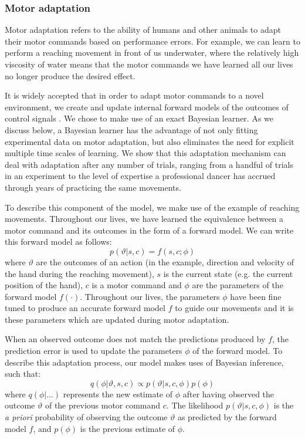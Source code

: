 \documentclass[a4paper,doc,floatsintext,natbib]{apa6}
\begin{document}
\subsubsection{Motor adaptation}
Motor adaptation refers to the ability of humans and other animals to adapt their motor commands based on performance errors. For example, we can learn to perform a reaching movement in front of us underwater, where the relatively high viscosity of water means that the motor commands we have learned all our lives no longer produce the desired effect.

It is widely accepted that in order to adapt motor commands to a novel environment, we create and update internal forward models of the outcomes of control signals \citep{Wolpert_Multiple_1998}. We chose to make use of an exact Bayesian learner. As we discuss below, a Bayesian learner has the advantage of not only fitting experimental data on motor adaptation, but also eliminates the need for explicit multiple time scales of learning. We show that this adaptation mechanism can deal with adaptation after any number of trials, ranging from a handful of trials in an experiment to the level of expertise a professional dancer has accrued through years of practicing the same movements.

To describe this component of the model, we make use of the example of reaching movements. Throughout our lives, we have learned the equivalence between a motor command and its outcomes in the form of a forward model. We can write this forward model as follows:
\begin{equation}
p(\vartheta | s, c) = f(s, c; \phi) \label{eqn:forward-model}
\end{equation}
where $\vartheta$ are the outcomes of an action (in the example, direction and velocity of the hand during the reaching movement), $s$ is the current state (e.g. the current position of the hand), $c$ is a motor command and $\phi$ are the parameters of the forward model $f(\cdot)$. Throughout our lives, the parameters $\phi$ have been fine tuned to produce an accurate forward model $f$ to guide our movements and it is these parameters which are updated during motor adaptation.

When an observed outcome does not match the predictions produced by $f$, the prediction error is used to update the parameters $\phi$ of the forward model. To describe this adaptation process, our model makes uses of Bayesian inference, such that:
\begin{equation}
q(\phi | \vartheta, s, c) \propto p(\vartheta | s, c, \phi)p(\phi)
\end{equation}
where $q(\phi | ...)$ represents the new estimate of $\phi$ after having observed the outcome $\vartheta$ of the previous motor command $c$. The likelihood $p(\vartheta | s, c, \phi)$ is the \textit{a priori} probability of observing the outcome $\vartheta$ as predicted by the forward model $f$, and $p(\phi)$ is the previous estimate of $\phi$.
\end{document}
